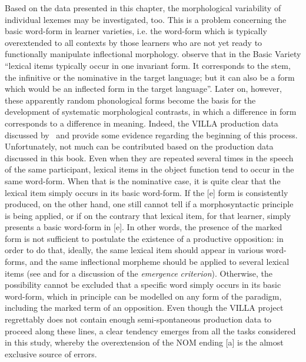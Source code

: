 Based on the data presented in this chapter, the morphological variability of individual lexemes may be investigated, too. This is a problem concerning the basic word-form in learner varieties, i.e. the word-form which is typically overextended to all contexts by those learners who are not yet ready to functionally manipulate inflectional morphology. \citet[311]{KleinPerdue1997} observe that in the Basic Variety “lexical items typically occur in one invariant form. It corresponds to the stem, the infinitive or the nominative in the target language; but it can also be a form which would be an inflected form in the target language”. Later on, however, these apparently random phonological forms become the basis for the development of systematic morphological contrasts, in which a difference in form corresponds to a difference in meaning. Indeed, the VILLA production data discussed by \citet{Bernini2018}~and \citet[28-33]{Dimroth2018} provide some evidence regarding the beginning of this process. Unfortunately, not much can be contributed based on the production data discussed in this book. Even when they are repeated several times in the speech of the same participant, lexical items in the object function tend to occur in the same word-form. When that is the nominative case, it is quite clear that the lexical item simply occurs in its basic word-form. If the [e] form is consistently produced, on the other hand, one still cannot tell if a morphosyntactic principle is being applied, or if on the contrary that lexical item, for that learner, simply presents a basic word-form in [e]. In other  words, the presence of the marked form is not sufficient to postulate the existence of a productive opposition: in order to do that, ideally, the same lexical item should appear in various word-forms, and the same inflectional morpheme should be applied to several lexical items (see \citet{Pienemann1998} and \citet{Pallotti2007} for a discussion of the \textit{emergence} \textit{criterion}). Otherwise, the possibility cannot be excluded that a specific word simply occurs in its basic word-form, which in principle can be modelled on any form of the paradigm, including the marked term of an opposition. Even though the VILLA project regrettably does not contain enough semi-spontaneous production data to proceed along these lines, a clear tendency emerges from all the tasks considered in this study, whereby the overextension of the NOM ending [a] is the almost exclusive source of errors.

